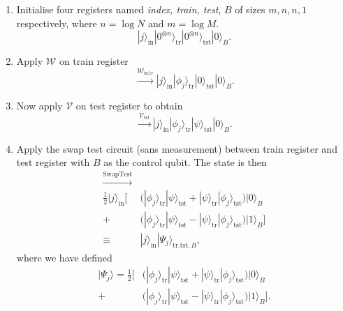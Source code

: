 \documentclass[a4paper,twocolumn,11pt,unpublished]{quantumarticle}
\newcommand{\rang}{\rangle}
\begin{document}
    \begin{enumerate}
        \item 
            \label{step1}
            Initialise four registers named \textit{index, train, test}, $B$ of sizes $m, n, n, 1$ respectively, where $n= \log N$ and $m = \log M$. 
            \begin{equation}
                |j\rang_{\text{in}}|0^{\otimes n}\rang_{\text{tr}}|0^{\otimes n}\rang_\text{tst}|0\rang_B.
            \end{equation}
    
        
        \item \label{fid_step2} 
            Apply $\mathcal W$  on train register 
            \begin{equation}
                     \xrightarrow{{\mathcal W _\text{in,tr}   }}  |j\rang_\text{in} |\phi_j\rang_{\text{tr}}|0\rang_\text{tst}|0\rang_B  .   
            \end{equation}
        
        \item  \label{V_oracle}    
            Now apply $\mathcal V$ on test register to obtain
            \begin{equation}
                \xrightarrow{{\mathcal V _\text{tst}}}  |j\rang_\text{in} |\phi_j\rang_{\text{tr}}|\psi\rang_\text{tst}|0\rang_B.
            \end{equation}
        
        \item \label{step4} 
            Apply the swap test circuit (sans measurement) between train register and test register with $B$ as the control qubit. The state is then
            \begin{equation}
                \label{swapteststate}
                \begin{split}
                    \xrightarrow{{ \text{SwapTest}}}\\
                    \frac{1}{2} |j\rang_\text{in}\bigg[ &\Big(|\phi_j\rang_{\text{tr}}|\psi\rang_\text{tst} + |\psi\rang_{\text{tr}}|\phi_j\rang_\text{tst}\Big)|0\rang_B  \\+ 
                    &\Big(|\phi_j\rang_{\text{tr}}|\psi\rang_\text{tst} - |\psi\rang_{\text{tr}}|\phi_j\rang_\text{tst}\Big)|1\rang_B
                    \bigg] \\\equiv  & |j\rang_{\text{in}}|\Psi_j\rang_{\text{tr,tst}, B},
                \end{split}
            \end{equation}
            where we have defined 
            \begin{equation}
            \begin{split}
                |\Psi_j\rang = \frac12  \Big[&\Big(|\phi_j\rang_{\text{tr}}|\psi\rang_\text{tst} + |\psi\rang_{\text{tr}}|\phi_j\rang_\text{tst}\Big)|0\rang_B  \\+ 
                 &\Big(|\phi_j\rang_{\text{tr}}|\psi\rang_\text{tst} - |\psi\rang_{\text{tr}}|\phi_j\rang_\text{tst}\Big)|1\rang_B\Big].
            \end{split}
            \end{equation}
             

\end{enumerate}
\end{document}
